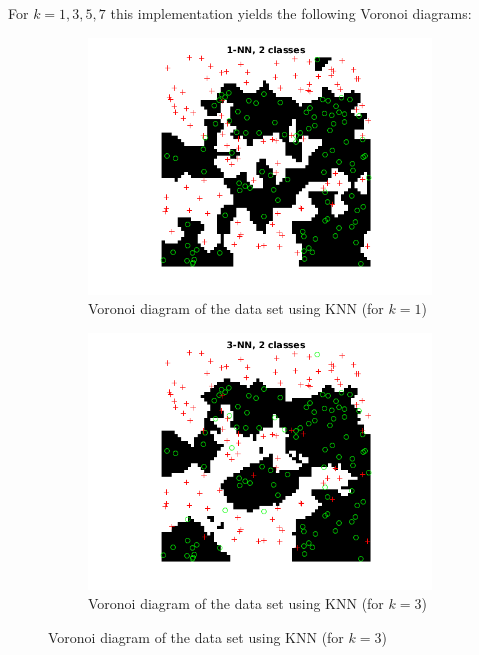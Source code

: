 \documentclass[10pt]{article}
\begin{document}
\subsection{}
For $k={1, 3, 5, 7}$ this implementation yields the following Voronoi diagrams:
\begin{figure}[H]
  \centering
  \begin{subfigure}{.48\textwidth}
    \includegraphics[width=1\linewidth]{assign2_2_1.png}
    \caption{Voronoi diagram of the data set using KNN (for $k=1$)}
    \label{fig2.1a}
  \end{subfigure}
  \begin{subfigure}{.48\textwidth}
    \includegraphics[width=1\linewidth]{assign2_2_3.png}
    \caption{Voronoi diagram of the data set using KNN (for $k=3$)}

\end{subfigure}
\end{figure}
\end{document}

